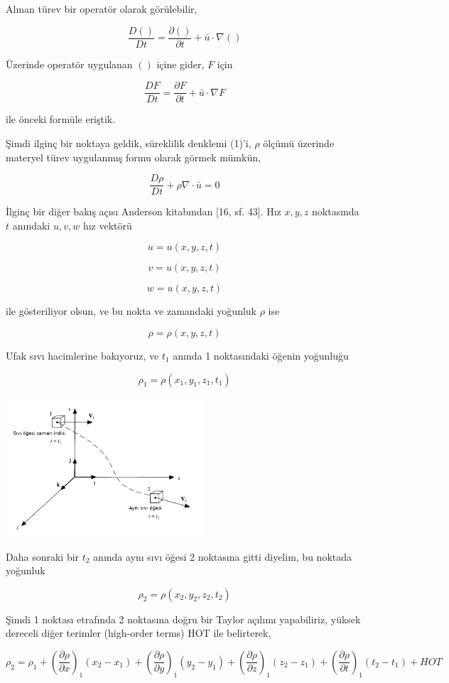 \documentclass[12pt,fleqn]{article}\usepackage{../../common}
\begin{document}
Alınan türev bir operatör olarak görülebilir, 

$$
\frac{D ()}{D t} = \frac{\partial () }{\partial t} + \bar{u} \cdot \nabla ()
$$

Üzerinde operatör uygulanan $()$ içine gider, $F$ için

$$
\frac{D F}{D t} = \frac{\partial F}{\partial t} + \bar{u} \cdot \nabla F
$$

ile önceki formüle eriştik.

Şimdi ilginç bir noktaya geldik, süreklilik denklemi (1)'i, $\rho$ ölçümü
üzerinde materyel türev uygulanmış formu olarak görmek mümkün,

$$
\frac{D \rho}{D t} + \rho \nabla \cdot \bar{u} = 0
$$

İlginç bir diğer bakış açısı Anderson kitabından [16, sf. 43]. Hız $x,y,z$
noktasında $t$ anındaki $u,v,w$ hız vektörü

$$
u = u(x,y,z,t)
$$

$$
v = u(x,y,z,t)
$$

$$
w = u(x,y,z,t)
$$

ile gösteriliyor olsun, ve bu nokta ve zamandaki yoğunluk $\rho$ ise

$$
\rho = \rho(x,y,z,t)
$$


Ufak sıvı hacimlerine bakıyoruz, ve $t_1$ anında 1 noktasındaki öğenin
yoğunluğu

$$
\rho_1 = \rho(x_1,y_1,z_1,t_1)
$$

\includegraphics[width=20em]{phy_050_cons_04.png}

Daha sonraki bir $t_2$ anında aynı sıvı öğesi 2 noktasına gitti diyelim, bu
noktada yoğunluk

$$
\rho_2 = \rho(x_2,y_2,z_2,t_2)
$$

Şimdi 1 noktası etrafında 2 noktasına doğru bir Taylor açılımı yapabiliriz,
yüksek dereceli diğer terimler (high-order terms) HOT ile belirterek,

$$
\rho_2 =
\rho_1 + \left( \frac{\partial \rho}{\partial x}  \right)_1 (x_2-x_1) +
\left( \frac{\partial \rho}{\partial y}  \right)_1 (y_2-y_1) +
\left( \frac{\partial \rho}{\partial z}  \right)_1 (z_2-z_1) +
\left( \frac{\partial \rho}{\partial t}  \right)_1 (t_2-t_1) +
HOT
$$
\end{document}
